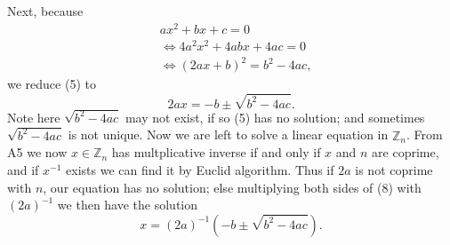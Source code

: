 \documentclass{article}
\begin{document}
Next, because
\begin{align}
    &ax^2+bx+c = 0\\
    &\Leftrightarrow 4a^2x^2+4abx+4ac = 0\\
    &\Leftrightarrow (2ax+b)^2
    =b^2-4ac,
\end{align}
we reduce (5) to 
\begin{equation}2ax = -b \pm \sqrt{b^2-4ac}.\end{equation}
Note here $\sqrt{b^2-4ac}$ may not exist, if so (5) has no solution; and sometimes $\sqrt{b^2-4ac}$ is not unique. Now we are left to solve a linear equation in $\mathbb{Z}_n$. From A5 we now $x \in \mathbb{Z}_n$ has multplicative inverse if and only if $x$ and $n$ are coprime, and if $x^{-1}$ exists we can find it by Euclid algorithm. Thus if $2a$ is not coprime with $n$, our equation has no solution; else multiplying both sides of (8) with $(2a)^{-1}$ we then have the solution
\begin{equation}
    x = (2a)^{-1} (-b \pm \sqrt{b^2-4ac}).
\end{equation}

\begin{example}

\end{example}




\end{document}
